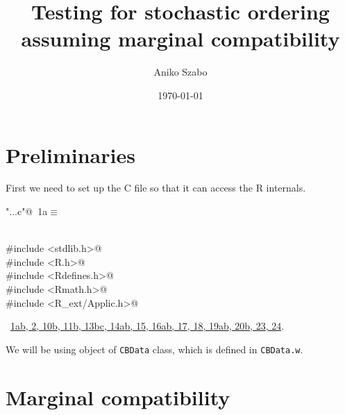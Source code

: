 \documentclass[reqno]{amsart}
\title{Testing for stochastic ordering assuming marginal compatibility}
\author{Aniko Szabo}
\date{\today}
\renewcommand{\NWtarget}[2]{\hypertarget{#1}{#2}}
\renewcommand{\NWlink}[2]{\hyperlink{#1}{#2}}
\begin{document}
\maketitle


\section{Preliminaries}

First we need to set up the C file so that it can access the R internals.
\begin{flushleft} \small
\begin{minipage}{\linewidth}\label{scrap1}\raggedright\small
\NWtarget{nuweb1a}{} \verb@"..\src\ReprodCalcs.c"@\nobreak\ {\footnotesize {1a}}$\equiv$
\vspace{-1ex}
\begin{list}{}{} \item
\mbox{}\verb@@\\
\mbox{}\verb@#include <stdlib.h>@\\
\mbox{}\verb@#include <R.h>@\\
\mbox{}\verb@#include <Rdefines.h>@\\
\mbox{}\verb@#include <Rmath.h>@\\
\mbox{}\verb@#include <R_ext/Applic.h>@\\
\mbox{}\verb@@{\NWsep}
\end{list}
\vspace{-1.5ex}
\footnotesize
\begin{list}{}{\setlength{\itemsep}{-\parsep}\setlength{\itemindent}{-\leftmargin}}
\item \NWtxtFileDefBy\ \NWlink{nuweb1a}{1a}\NWlink{nuweb1b}{b}\NWlink{nuweb2}{, 2}\NWlink{nuweb10b}{, 10b}\NWlink{nuweb11b}{, 11b}\NWlink{nuweb13b}{, 13b}\NWlink{nuweb13c}{c}\NWlink{nuweb14a}{, 14a}\NWlink{nuweb14b}{b}\NWlink{nuweb15}{, 15}\NWlink{nuweb16a}{, 16a}\NWlink{nuweb16b}{b}\NWlink{nuweb17}{, 17}\NWlink{nuweb18}{, 18}\NWlink{nuweb19a}{, 19a}\NWlink{nuweb19b}{b}\NWlink{nuweb20b}{, 20b}\NWlink{nuweb23}{, 23}\NWlink{nuweb24}{, 24}.

\item{}
\end{list}
\end{minipage}\vspace{4ex}
\end{flushleft}
We will be using object of \texttt{CBData} class, which is defined in \texttt{CBData.w}.


\section{Marginal compatibility}
\end{document}
